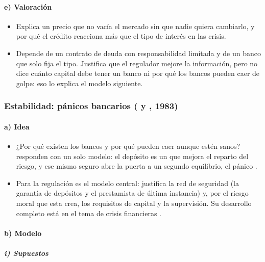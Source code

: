\documentclass[11pt]{article}
\begin{document}
\paragraph{e) Valoración}

\begin{itemize}
\item Explica un precio que no vacía el mercado sin que nadie quiera cambiarlo, y por qué el crédito reacciona más que el tipo de interés en las crisis.
\item Depende de un contrato de deuda con responsabilidad limitada y de un banco que solo fija el tipo. Justifica que el regulador mejore la información, pero no dice cuánto capital debe tener un banco ni por qué los bancos pueden caer de golpe: eso lo explica el modelo siguiente.
\end{itemize}

\subsubsection{Estabilidad: pánicos bancarios ( y , 1983)}\label{sec:diamond-dybvig}

\paragraph{a) Idea}

\begin{itemize}
\item ¿Por qué existen los bancos y por qué pueden caer aunque estén sanos? \textcite{DiamondDybvig1983Bank} responden con un solo modelo: el depósito es un  que mejora el reparto del riesgo, y ese mismo seguro abre la puerta a un segundo equilibrio, el pánico .
\item Para la regulación es el modelo central: justifica la red de seguridad (la garantía de depósitos y el prestamista de última instancia) y, por el riesgo moral que esta crea, los requisitos de capital y la supervisión. Su desarrollo completo está en el tema de crisis financieras .
\end{itemize}

\paragraph{b) Modelo}

\subparagraph{i) Supuestos}
\end{document}

